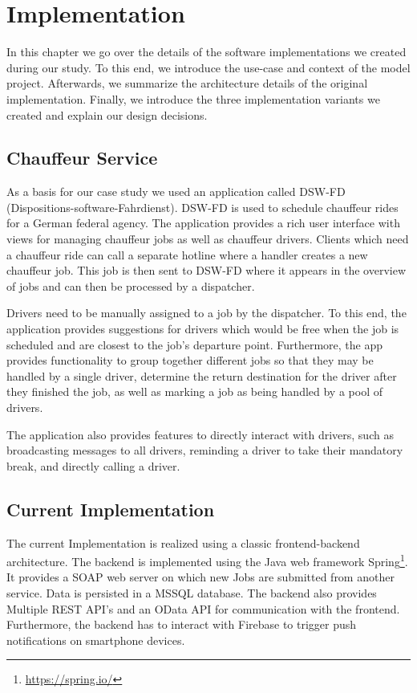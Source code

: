 \chapter{Implementation}
\label{ch:implementation}
In this chapter we go over the details of the software implementations we created during our study. To this end, we introduce the use-case and context of the model project. Afterwards, we summarize the architecture details of the original implementation. Finally, we introduce the three implementation variants we created and explain our design decisions.  

\section{Chauffeur Service}
As a basis for our case study we used an application called DSW-FD (Dispositions-software-Fahrdienst). DSW-FD is used to schedule chauffeur rides for a German federal agency. The application provides a rich user interface with views for managing chauffeur jobs as well as chauffeur drivers. Clients which need a chauffeur ride can call a separate hotline where a handler creates a new chauffeur job. This job is then sent to DSW-FD where it appears in the overview of jobs and can then be processed by a dispatcher.

Drivers need to be manually assigned to a job by the dispatcher. To this end, the application provides suggestions for drivers which would be free when the job is scheduled and are closest to the job's departure point. Furthermore, the app provides functionality to group together different jobs so that they may be handled by a single driver, determine the return destination for the driver after they finished the job, as well as marking a job as being handled by a pool of drivers.

The application also provides features to directly interact with drivers, such as broadcasting messages to all drivers, reminding a driver to take their mandatory break, and directly calling a driver.

\section{Current Implementation}
The current Implementation is realized using a classic frontend-backend architecture. The backend is implemented using the Java web framework Spring\footnote{\url{https://spring.io/}}. It provides a SOAP web server on which new Jobs are submitted from another service. Data is persisted in a MSSQL database. The backend also provides Multiple REST API's and an OData API for communication with the frontend. Furthermore, the backend has to interact with Firebase to trigger push notifications on smartphone devices.

